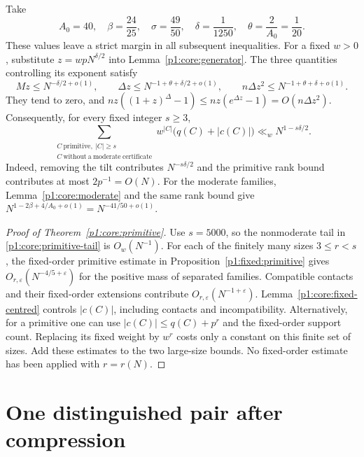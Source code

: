 Take
\begin{equation}
 A_0=40,\quad\beta=\frac{24}{25},\quad\sigma=\frac{49}{50},
 \quad\delta=\frac1{1250},\quad\theta=\frac2{A_0}=\frac1{20}.
 \label{p1:core:primitive-parameters}
\end{equation}
These values leave a strict margin in all subsequent inequalities.
For a fixed $w>0$, substitute $z=wpN^{\delta/2}$ into
Lemma~\ref{p1:core:generator}. The three quantities controlling its
exponent satisfy
\[
 Mz\le N^{-\delta/2+o(1)},\qquad
 \Delta z\le N^{-1+\theta+\delta/2+o(1)},\qquad
 n\Delta z^2\le N^{-1+\theta+\delta+o(1)}.
\]
They tend to zero, and
$nz((1+z)^\Delta-1)\le nz(e^{\Delta z}-1)=O(n\Delta z^2)$.
Consequently, for every fixed integer $s\ge3$,
\begin{equation}
 \sum_{\substack{C\ \mathrm{primitive},\ |C|\ge s\\
                         C\ \mathrm{without\ a\ moderate\ certificate}}}
 w^{|C|}\bigl(q(C)+|c(C)|\bigr)
 \ll_w N^{1-s\delta/2}.
 \label{p1:core:primitive-tail}
\end{equation}
Indeed, removing the tilt contributes $N^{-s\delta/2}$ and the
primitive rank bound contributes at most $2p^{-1}=O(N)$.
For the moderate families, Lemma~\ref{p1:core:moderate} and the same
rank bound give $N^{1-2\beta+4/A_0+o(1)}=N^{-41/50+o(1)}$.

\begin{proof}[Proof of Theorem~\ref{p1:core:primitive}]
Use $s=5000$, so the nonmoderate tail in
\eqref{p1:core:primitive-tail} is $O_w(N^{-1})$.
For each of the finitely many sizes $3\le r<s$, the fixed-order
primitive estimate in Proposition~\ref{p1:fixed:primitive} gives
$O_{r,\varepsilon}(N^{-4/5+\varepsilon})$
for the positive mass of separated families. Compatible contacts and
their fixed-order extensions contribute $O_{r,\varepsilon}(N^{-1+\varepsilon})$.
Lemma~\ref{p1:core:fixed-centred} controls $|c(C)|$,
including contacts and incompatibility. Alternatively, for a primitive
one can use $|c(C)|\le q(C)+p^r$ and the fixed-order support count.
Replacing its fixed weight by $w^r$ costs only a constant on this
finite set of sizes. Add these estimates to the two large-size bounds.
No fixed-order estimate has been applied with $r=r(N)$.
\end{proof}

\section{One distinguished pair after compression}
\label{p1:core:compression-section}

